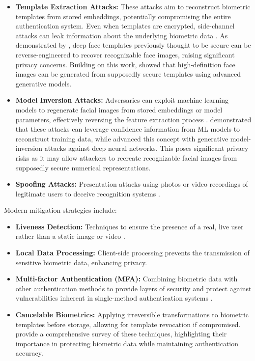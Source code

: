 \begin{itemize}
\item \textbf{Template Extraction Attacks:} These attacks aim to reconstruct biometric templates from stored embeddings, potentially compromising the entire authentication system. Even when templates are encrypted, side-channel attacks can leak information about the underlying biometric data \autocite{Mai2019, Dong2021}. As demonstrated by \textcite{Mai2019}, deep face templates previously thought to be secure can be reverse-engineered to recover recognizable face images, raising significant privacy concerns. Building on this work, \textcite{Dong2021} showed that high-definition face images can be generated from supposedly secure templates using advanced generative models.

\item \textbf{Model Inversion Attacks:} Adversaries can exploit machine learning models to regenerate facial images from stored embeddings or model parameters, effectively reversing the feature extraction process \autocite{Fredrikson2015, Zhang2020}. \textcite{Fredrikson2015} demonstrated that these attacks can leverage confidence information from ML models to reconstruct training data, while \textcite{Zhang2020} advanced this concept with generative model-inversion attacks against deep neural networks. This poses significant privacy risks as it may allow attackers to recreate recognizable facial images from supposedly secure numerical representations.

\item \textbf{Spoofing Attacks:} Presentation attacks using photos or video recordings of legitimate users to deceive recognition systems \autocite{Kuznetsov2024}.
\end{itemize}

Modern mitigation strategies include:
\begin{itemize}
\item \textbf{Liveness Detection:} Techniques to ensure the presence of a real, live user rather than a static image or video \autocite{Kuznetsov2024}.

\item \textbf{Local Data Processing:} Client-side processing prevents the transmission of sensitive biometric data, enhancing privacy.

\item \textbf{Multi-factor Authentication (MFA):} Combining biometric data with other authentication methods to provide layers of security and protect against vulnerabilities inherent in single-method authentication systems \autocite{Furnell2022}.

\item \textbf{Cancelable Biometrics:} Applying irreversible transformations to biometric templates before storage, allowing for template revocation if compromised. \textcite{Rathgeb2011} provide a comprehensive survey of these techniques, highlighting their importance in protecting biometric data while maintaining authentication accuracy.
\end{itemize}

